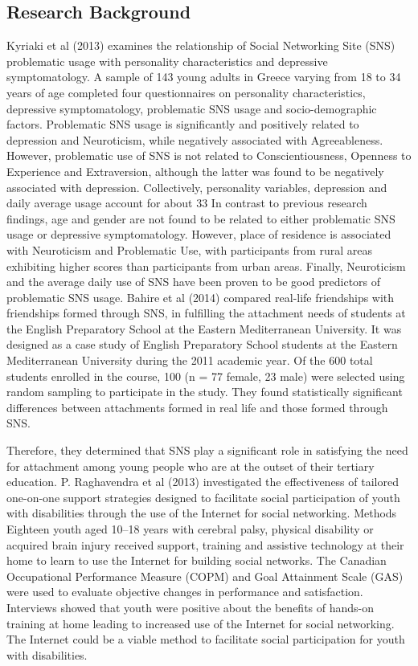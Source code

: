 \documentclass[options]{article}
\begin{document}
\subsection{\textbf{Research Background}}
Kyriaki et al (2013) examines the relationship of Social Networking Site (SNS) problematic usage with personality characteristics and depressive symptomatology. A sample of 143 young adults in Greece varying from 18 to 34 years of age completed four questionnaires on personality characteristics, depressive symptomatology, problematic SNS usage and socio-demographic factors. Problematic SNS usage is significantly and positively related to depression and Neuroticism, while negatively associated with Agreeableness. However, problematic use of SNS is not related to Conscientiousness, Openness to Experience and Extraversion, although the latter was found to be negatively associated with depression. Collectively, personality variables, depression and daily average usage account for about 33%
In contrast to previous research findings, age and gender are not found to be related to either problematic SNS usage or depressive symptomatology. However, place of residence is associated with Neuroticism and Problematic Use, with participants from rural areas exhibiting higher scores than participants from urban areas. Finally, Neuroticism and the average daily use of SNS have been proven to be good predictors of problematic SNS usage. Bahire et al (2014) compared real-life friendships with friendships formed through SNS, in fulfilling the attachment needs of students at the English Preparatory School at the Eastern Mediterranean University. It was designed as a case study of English Preparatory School students at the Eastern Mediterranean University during the 2011 academic year. Of the 600 total students enrolled in the course, 100 (n = 77 female, 23 male) were selected using random sampling to participate in the study. They found statistically significant differences between attachments formed in real life and those formed through SNS.
 
  \bigbreak
Therefore, they determined that SNS play a significant role in satisfying the need for attachment among young people who are at the outset of their tertiary education. P. Raghavendra et al (2013) investigated the effectiveness of tailored one-on-one support strategies designed to facilitate social participation of youth with disabilities through the use of the Internet for social networking. Methods Eighteen youth aged 10–18 years with cerebral palsy, physical disability or acquired brain injury received support, training and assistive technology at their home to learn to use the Internet for building social networks. The Canadian Occupational Performance Measure (COPM) and Goal Attainment Scale (GAS) were used to evaluate objective changes in performance and satisfaction. Interviews showed that youth were positive about the benefits of hands-on training at home leading to increased use of the Internet for social networking. The Internet could be a viable method to facilitate social participation for youth with disabilities.  \bigbreak
\end{document}
